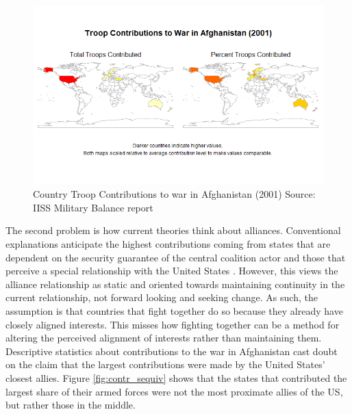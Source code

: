\documentclass[12pt,letterpaper]{article}
\begin{document}
		\begin{figure}[H]
			\centering
			\includegraphics[width=\textwidth]{troops_2001_sidebyside_scaled.png}
			\caption{Country Troop Contributions to war in Afghanistan (2001) Source: IISS Military Balance report}
			\label{fig:contrib_map}
		\end{figure}

		The second problem is how current theories think about alliances. Conventional explanations anticipate the highest contributions coming from states that are dependent on the security guarantee of the central coalition actor and those that perceive a special relationship with the United States \citep{haesebrouck_democraticparticipationair_2016, howorth_securitydefencepolicy_2014, graeger_revivalatlanticismnato_2009, biehl_strategiccultureseurope_2013}. However, this views the alliance relationship as static and oriented towards maintaining continuity in the current relationship, not forward looking and seeking change. As such, the assumption is that countries that fight together do so because they already have closely aligned interests.  This misses how fighting together can be a method for altering the perceived alignment of interests rather than maintaining them. Descriptive statistics about contributions to the war in Afghanistan cast doubt on the claim that the largest contributions were made by the United States' closest allies. Figure \ref{fig:contr_sequiv} shows that the states that contributed the largest share of their armed forces were not the most proximate allies of the US, but rather those in the middle.
\end{document}
